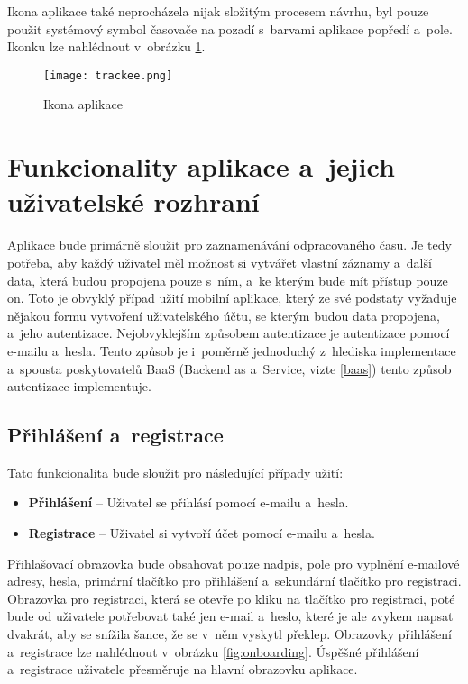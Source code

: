 Ikona aplikace také neprocházela nijak složitým procesem návrhu, byl pouze použit systémový symbol časovače na pozadí s~barvami aplikace popředí a~pole. Ikonku lze nahlédnout v~obrázku \ref{fig:app-icon}.

\begin{figure}[h]
	\centering
	\texttt{[image: trackee.png]}
	\caption{Ikona aplikace}
	\label{fig:app-icon}
\end{figure}

\section{Funkcionality aplikace a~jejich uživatelské rozhraní}\label{features}

Aplikace bude primárně sloužit pro zaznamenávání odpracovaného času. Je tedy potřeba, aby každý uživatel měl možnost si vytvářet vlastní záznamy a~další data, která budou propojena pouze s~ním, a~ke kterým bude mít přístup pouze on. Toto je obvyklý případ užití mobilní aplikace, který ze své podstaty vyžaduje nějakou formu vytvoření uživatelského účtu, se kterým budou data propojena, a~jeho autentizace. Nejobvyklejším způsobem autentizace je autentizace pomocí e-mailu a~hesla. Tento způsob je i~poměrně jednoduchý z~hlediska implementace a~spousta poskytovatelů BaaS (Backend as a~Service, vizte \ref{baas}) tento způsob autentizace implementuje. 

\subsection{Přihlášení a~registrace}\label{feature-onboarding}

Tato funkcionalita bude sloužit pro následující případy užití:
\begin{itemize}
\item\textbf{Přihlášení} – Uživatel se přihlásí pomocí e-mailu a~hesla.
\item\textbf{Registrace} – Uživatel si vytvoří účet pomocí e-mailu a~hesla.
\end{itemize}

Přihlašovací obrazovka bude obsahovat pouze nadpis, pole pro vyplnění e-mailové adresy, hesla, primární tlačítko pro přihlášení a~sekundární tlačítko pro registraci. Obrazovka pro registraci, která se otevře po kliku na tlačítko pro registraci, poté bude od uživatele potřebovat také jen e-mail a~heslo, které je ale zvykem napsat dvakrát, aby se snížila šance, že se v~něm vyskytl překlep. Obrazovky přihlášení a~registrace lze nahlédnout v~obrázku \ref{fig:onboarding}. Úspěšné přihlášení a~registrace uživatele přesměruje na hlavní obrazovku aplikace.

